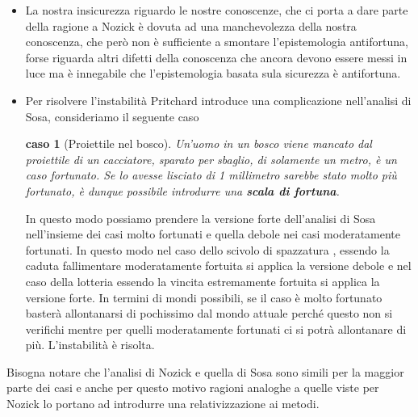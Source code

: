 \documentclass[10pt,a4paper]{article}
\newtheorem{caso}{caso}
\begin{document}
\begin{itemize}
	\item La nostra insicurezza riguardo le nostre conoscenze, che ci porta a dare parte della ragione a Nozick è dovuta ad una manchevolezza della nostra conoscenza, che però non è sufficiente a smontare l'epistemologia antifortuna, forse riguarda altri difetti della conoscenza che ancora devono essere messi in luce ma è innegabile che l'epistemologia basata sula sicurezza è antifortuna. 
	\item Per risolvere l'instabilità Pritchard introduce una complicazione nell'analisi di Sosa, consideriamo il seguente caso
	\begin{caso}[Proiettile nel bosco]
		Un'uomo in un bosco viene mancato dal proiettile di un cacciatore, sparato per sbaglio, di solamente un metro, è un caso fortunato. Se lo avesse lisciato di 1 millimetro sarebbe stato molto più fortunato, è dunque possibile introdurre una \textbf{scala di fortuna}.
	\end{caso}
	In questo modo possiamo prendere la versione forte dell'analisi di Sosa nell'insieme dei casi molto fortunati e quella debole nei casi moderatamente fortunati. In questo modo nel caso dello scivolo di spazzatura , essendo la caduta fallimentare moderatamente fortuita si applica la versione debole e nel caso della lotteria essendo la vincita estremamente fortuita si applica la versione forte. In termini di mondi possibili, se il caso è molto fortunato basterà allontanarsi di pochissimo dal mondo attuale perché questo non si verifichi mentre per quelli moderatamente fortunati ci si potrà allontanare di più. L'instabilità è risolta. 
\end{itemize}
Bisogna notare che l'analisi di Nozick e quella di Sosa sono simili per la maggior parte dei casi e anche per questo motivo ragioni analoghe a quelle viste per Nozick lo portano ad introdurre una relativizzazione ai metodi.

\newpage
\end{document}
